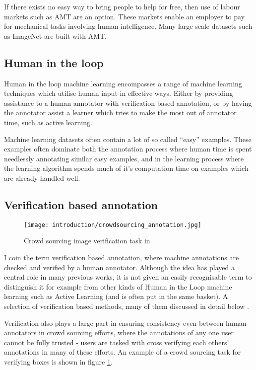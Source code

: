 If there exists no easy way to bring people to help for free, then use of labour markets such as \gls{AMT} are an option. These markets enable an employer to pay for mechanical tasks involving human intelligence. Many large scale datasets such as ImageNet \cite{Russakovsky2015} are built with \gls{AMT}. 


\subsection{Human in the loop}

Human in the loop machine learning encompasses a range of machine learning techniques which utilise human input in effective ways. Either by providing assistance to a human annotator with verification based annotation, or by having the annotator assist a learner which tries to make the most out of annotator time, such as active learning.

Machine learning datasets often contain a lot of so called ``easy'' examples. These examples often dominate both the annotation process where human time is spent needlessly annotating similar easy examples, and in the learning process where the learning algorithm spends much of it's computation time on examples which are already handled well. 


\subsection{Verification based annotation}

\begin{figure}[h]
  \centering
  \texttt{[image: introduction/crowdsourcing\_annotation.jpg]}
  \caption{Crowd sourcing image verification task in \cite{Su2012a}} 
  \label{fig:crowdsourcing}
\end{figure}

I coin the term verification based annotation, where machine annotations are checked and verified by a human annotator. Although the idea has played a central role in many previous works, it is not given an easily recognisable term to distinguish it for example from other kinds of Human in the Loop machine learning such as Active Learning (and is often put in the same basket). A selection of verification based methods, many of them discussed in detail below \cite{Yao2012, McNeill2011, Adhikaria2018, Castrejon2017, Papadopoulos2016, Russakovsky2015a}. 

Verification also plays a large part in ensuring consistency even between human annotators in crowd sourcing efforts, where the annotations of any one user cannot be fully trusted - users are tasked with cross verifying each others' annotations in many of these efforts. An example of a crowd sourcing task \cite{Su2012a} for verifying boxes is shown in figure \ref{fig:crowdsourcing}.

